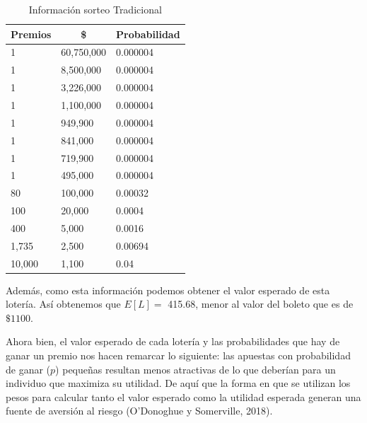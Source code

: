 \begin{table}[H]
\centering
\caption{Información sorteo Tradicional}
\label{tab:trad}
\begin{tabular}{@{}lll@{}}
\toprule
\multicolumn{1}{c}{Premios} & \multicolumn{1}{c}{\$} & \multicolumn{1}{c}{Probabilidad} \\ \midrule
1                           & 60,750,000               & 0.000004                         \\
1                           & 8,500,000                & 0.000004                         \\
1                           & 3,226,000                & 0.000004                         \\
1                           & 1,100,000                & 0.000004                         \\
1                           & 949,900                 & 0.000004                         \\
1                           & 841,000                 & 0.000004                         \\
1                           & 719,900                 & 0.000004                         \\
1                           & 495,000                 & 0.000004                         \\
80                          & 100,000                 & 0.00032                          \\
100                         & 20,000                  & 0.0004                           \\
400                         & 5,000                   & 0.0016                           \\
1,735                        & 2,500                   & 0.00694                          \\
10,000                       & 1,100                   & 0.04                             \\ \bottomrule
\end{tabular}
\end{table}

Además, como esta información podemos obtener el valor esperado de esta lotería. Así obtenemos que $E[L] = $ 415.68, menor al valor del boleto que es de $\$ 1100$. \\

\newpage

Ahora bien, el valor esperado de cada lotería y las probabilidades que hay de ganar un premio nos hacen remarcar lo siguiente: las apuestas con probabilidad de ganar ($p$) pequeñas resultan menos atractivas de lo que deberían para un individuo que maximiza su utilidad. De aquí que la forma en que se utilizan los pesos para calcular tanto el valor esperado como la utilidad esperada generan una fuente de aversión al riesgo (O’Donoghue y Somerville, 2018). \\

